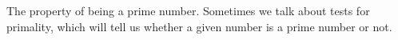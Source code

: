 The property of being a prime number. Sometimes we talk about tests for primality,
which will tell us whether a given number is a prime number or not.